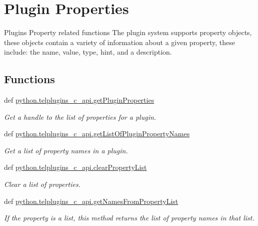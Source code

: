 \hypertarget{group__plugin__properties}{\section{Plugin Properties}
\label{group__plugin__properties}
}


Plugins Property related functions The plugin system supports property objects, these objects contain a variety of information about a given property, these include\-: the name, value, type, hint, and a description.  


\subsection*{Functions}
\begin{DoxyCompactItemize}
\item 
def \hyperlink{group__plugin__properties_ga2c801cf4642a4a2efc750a4d1d983734}{python.\-telplugins\-\_\-c\-\_\-api.\-get\-Plugin\-Properties}
\begin{DoxyCompactList}\small\item\em Get a handle to the list of properties for a plugin. \end{DoxyCompactList}\item 
def \hyperlink{group__plugin__properties_ga1640824ba8809fc440d648936eec17c6}{python.\-telplugins\-\_\-c\-\_\-api.\-get\-List\-Of\-Plugin\-Property\-Names}
\begin{DoxyCompactList}\small\item\em Get a list of property names in a plugin. \end{DoxyCompactList}\item 
def \hyperlink{group__plugin__properties_ga5f61e195365f974a60d672b6ef39e2b1}{python.\-telplugins\-\_\-c\-\_\-api.\-clear\-Property\-List}
\begin{DoxyCompactList}\small\item\em Clear a list of properties. \end{DoxyCompactList}\item 
def \hyperlink{group__plugin__properties_gae522e703464f20a1416e1b21083d923b}{python.\-telplugins\-\_\-c\-\_\-api.\-get\-Names\-From\-Property\-List}
\begin{DoxyCompactList}\small\item\em If the property is a list, this method returns the list of property names in that list. \end{DoxyCompactList}\item 

\end{DoxyCompactItemize}
